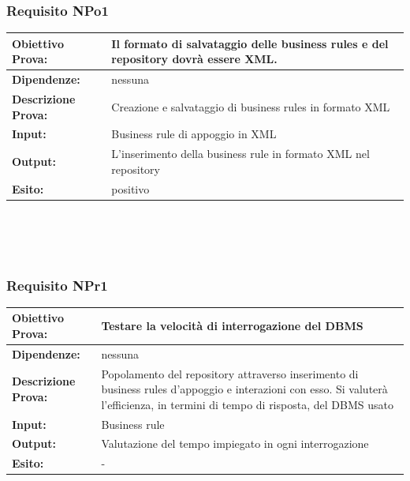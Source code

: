 \documentclass[11pt,titlepage,a4paper]{report}
\begin{document}
\subsubsection{Requisito NPo1}
\begin{tabular}{||p{4.5cm}||p{7.5cm}||}
\hline
{\textbf{Obiettivo Prova:}}& Il formato di salvataggio delle business rules e del repository dovr\`a essere XML.\\ \hline
{\textbf{Dipendenze:}}& nessuna \\ \hline
{\textbf{Descrizione Prova:}}&  Creazione e salvataggio di business rules in formato XML  \\ \hline
{\textbf{Input:}}&  Business rule di appoggio in XML \\ \hline
{\textbf{Output:}}& L'inserimento della business rule in formato XML nel repository \\ \hline
{\textbf{Esito:}}& positivo\\ \hline
\end{tabular} \\
\\
\\
\subsubsection{Requisito NPr1}
\begin{tabular}{||p{4.5cm}||p{7.5cm}||}
\hline
{\textbf{Obiettivo Prova:}}& Testare la velocit\`a di interrogazione del DBMS\\ \hline
{\textbf{Dipendenze:}}& nessuna \\ \hline
{\textbf{Descrizione Prova:}}& Popolamento del repository attraverso inserimento di business rules d'appoggio e interazioni con esso. Si valuter\`a l'efficienza, in termini di tempo di risposta, del DBMS usato  \\ \hline
{\textbf{Input:}}& Business rule \\ \hline
{\textbf{Output:}}& Valutazione del tempo impiegato in ogni interrogazione \\ \hline
{\textbf{Esito:}}& - \\ \hline
\end{tabular} \\
\\
\\
\end{document}
